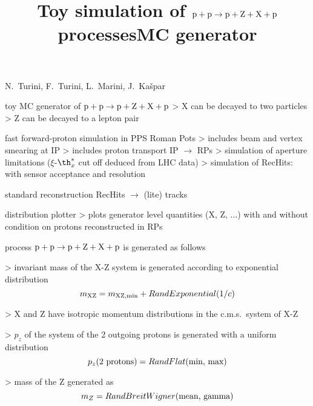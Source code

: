 


\newpage %

\def\author{PPS}
\def\caption{PPXZ generator}
\def\date{24 Oct 2018}

\newpage %
\hbox{}
\vfil
\title{Toy simulation of $\rm p + p \rightarrow p + Z + X + p$ processes}
\vskip3mm
\centerline{N.~Turini, F.~Turini, L.~Marini, J.~Ka\v spar}
\vfil


\newpage %

\> toy MC generator of $\rm p + p \rightarrow p + Z + X + p$
\>> X can be decayed to two particles
\>> Z can be decayed to a lepton pair

\> fast forward-proton simulation in PPS Roman Pots
\>> includes beam and vertex smearing at IP
\>> includes proton transport IP $\rightarrow$ RPs
\>> simulation of aperture limitations ($\xi$-$\th^*_x$ cut off deduced from LHC data)
\>> simulation of RecHits: with sensor acceptance and resolution

\> standard reconstruction RecHits $\rightarrow$ (lite) tracks

\> distribution plotter
\>> plots generator level quantities (X, Z, ...) with and without condition on protons reconstructed in RPs



\newpage %
\title{MC generator}

\> process $\rm p + p \rightarrow p + Z + X + p$ is generated as follows

\>> invariant mass of the X-Z system is generated according to exponential distribution
\vskip-3mm
\cThird
$$m_{\rm XZ} = m_{\rm XZ,min} + RandExponential(1/c)$$
\vskip2mm

\>> X and Z have isotropic momentum distributions in the c.m.s.~system of X-Z

\>> $p_z$ of the system of the 2 outgoing protons is generated with a uniform distribution
\cThird
\vskip-2mm
$$p_z(\hbox{2 protons}) = RandFlat(\hbox{min, max})$$
\vskip2mm

\>> mass of the Z generated as
\cThird
\vskip-2mm
$$m_Z = RandBreitWigner(\hbox{mean, gamma})$$
\vskip2mm


